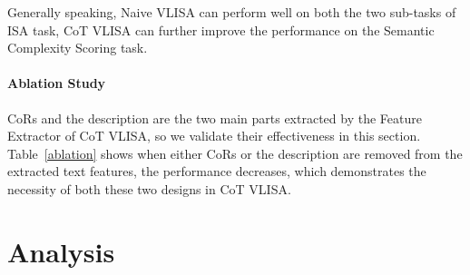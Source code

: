 Generally speaking, Naive VLISA can perform well on both the two sub-tasks of ISA task, CoT VLISA can further improve the performance on the Semantic Complexity Scoring task.






\paragraph{Ablation Study}

CoRs and the description are the two main parts extracted by the Feature Extractor of CoT VLISA, so we validate their effectiveness in this section.
Table~\ref{ablation} shows when either CoRs or the description are removed from the extracted text features, the performance decreases, which demonstrates the necessity of both these two designs in CoT VLISA. 




\section{Analysis}

